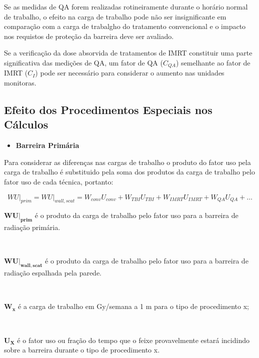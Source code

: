 \documentclass[11pt,a4paper]{article}
\newcounter{exemplo}
\begin{document}
        Se as medidas de QA forem realizadas rotineiramente durante o horário normal de trabalho, o efeito na carga de trabalho pode não ser insignificante em comparação com a carga de trabalgho do tratamento convencional e o impacto nos requistos de proteção da barreira deve ser avaliado. 

        Se a verificação da dose absorvida de tratamentos de IMRT constituir uma parte significativa das medições de QA, um fator de QA ($C_{QA}$) semelhante ao fator de IMRT ($C_I$) pode ser necessário para considerar o aumento nas unidades monitoras.


    \subsection{Efeito dos Procedimentos Especiais nos Cálculos}

        \begin{itemize}
            \item \textbf{\textcolor{CarnationPink}{Barreira Primária}}
        \end{itemize}

        Para considerar as diferenças nas cargas de trabalho o produto do fator uso pela carga de trabalho é substituido pela soma dos produtos da carga de trabalho pelo fator uso de cada técnica, portanto:


        \begin{equation}
            WU\vert _{prim} = WU\vert _{wall,scat} = W_{conv}U_{conv} + W_{TBI}U_{TBI} + W_{IMRT}U_{IMRT} + W_{QA}U_{QA} + \dots
        \end{equation}

        \begin{exemplo}[onde:]
            \textcolor{CarnationPink}{$\mathbf{ WU\vert _{prim}}$} é o produto da carga de trabalho pelo fator uso para a barreira de radiação primária.

            \


            \textcolor{CarnationPink}{$\mathbf{WU\vert _{wall,scat}}$} é o produto da carga de trabalho pelo fator uso para a barreira de radiação espalhada pela parede.
            
            \

            
            \textcolor{CarnationPink}{$\mathbf{W_x}$} é a carga de trabalho em Gy/semana a 1 m para o tipo de procedimento x;
            
            \

            
            \textcolor{CarnationPink}{$\mathbf{U_X}$} é o fator uso ou fração do tempo que o feixe provavelmente estará incidindo sobre a barreira durante o tipo de procedimento x.
        \end{exemplo}
    
\end{document}

